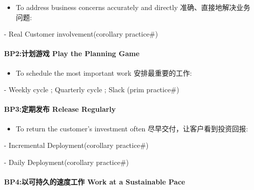 \begin{itemize}
\tightlist
\item
  To address business concerns accurately and directly
  准确、直接地解决业务问题:
\end{itemize}

\begin{description}
\tightlist
\item[]
- Real Customer involvement(corollary practice\#)
\end{description}

\hypertarget{bp2ux8ba1ux5212ux6e38ux620f-play-the-planning-game}{%
\paragraph{BP2:计划游戏 Play the Planning
Game}\label{bp2ux8ba1ux5212ux6e38ux620f-play-the-planning-game}}

\begin{itemize}
\tightlist
\item
  To schedule the most important work 安排最重要的工作:\\
\end{itemize}

\begin{description}
\tightlist
\item[]
- Weekly cycle ; Quarterly cycle ; Slack (prim practice\#)
\end{description}

\hypertarget{bp3ux5b9aux671fux53d1ux5e03-release-regularly}{%
\paragraph{BP3:定期发布 Release
Regularly}\label{bp3ux5b9aux671fux53d1ux5e03-release-regularly}}

\begin{itemize}
\tightlist
\item
  To return the customer's investment often
  尽早交付，让客户看到投资回报:
\end{itemize}

\begin{description}
\tightlist
\item[]
- Incremental Deployment(corollary practice\#)

- Daily Deployment(corollary practice\#)
\end{description}

\hypertarget{bp4ux4ee5ux53efux6301ux4e45ux7684ux901fux5ea6ux5de5ux4f5c-work-at-a-sustainable-pace}{%
\paragraph{BP4:以可持久的速度工作 Work at a Sustainable
Pace}\label{bp4ux4ee5ux53efux6301ux4e45ux7684ux901fux5ea6ux5de5ux4f5c-work-at-a-sustainable-pace}}

